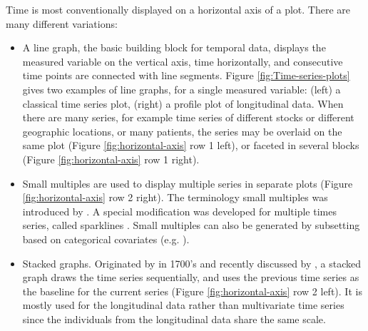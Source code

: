\documentclass[12pt]{article}
\newcommand{\red}[1]{{\color{red} #1}}
\begin{document}
Time is most conventionally displayed on a horizontal axis of a plot. There are many different variations:

\begin{itemize} \itemsep 0in
\item A line graph, the basic building block for temporal data, displays the measured variable on the vertical axis, time horizontally, and consecutive time points are connected with line segments. Figure \ref{fig:Time-series-plots} gives two examples of line graphs, for a single measured variable: (left) a classical time series plot, (right) a profile plot of longitudinal data. When there are many series, for example time series of different stocks or different geographic locations, or many patients, the series may be overlaid on the same plot (Figure \ref{fig:horizontal-axis} row 1 left), or faceted in several blocks (Figure \ref{fig:horizontal-axis} row 1 right).


\item Small multiples are used to display multiple series in separate plots (Figure \ref{fig:horizontal-axis} row 2 right). The terminology small multiples was introduced by \citet{tufte1983visual}. A special modification was developed for multiple times series, called sparklines \citet{tufte2006evidence}. Small multiples can also be generated by subsetting based on categorical covariates (e.g. \citet{cleveland1993}).

\item Stacked graphs. Originated by \citeauthor{playfair2005playfair} in
1700's and recently discussed by \citet{byron2008stacked,javed2010graphical,heer2010tour},
a stacked graph draws the time series sequentially, and uses the previous
time series as the baseline for the current series (Figure \ref{fig:horizontal-axis} row 2 left). It is mostly used
for the longitudinal data rather than multivariate time series since
the individuals from the longitudinal data share the same scale.


\end{itemize}
\end{document}
